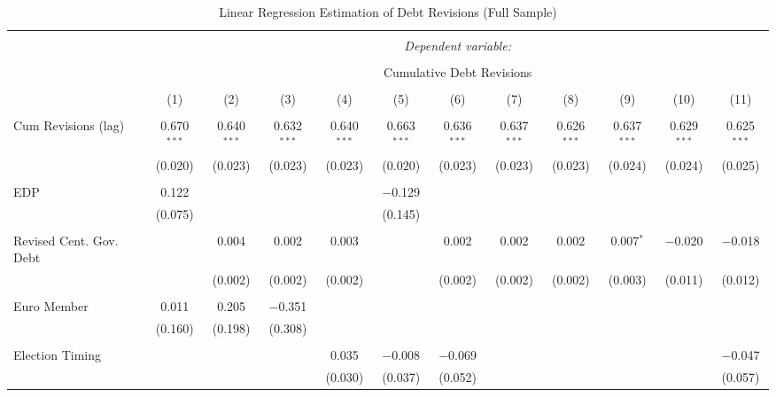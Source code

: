 
\begin{table}[!htbp] \centering 
  \caption{Linear Regression Estimation of Debt Revisions (Full Sample)} 
  \label{debt_results} 
\tiny 
\begin{tabular}{@{\extracolsep{5pt}}lccccccccccc} 
\\[-1.8ex]\hline 
\hline \\[-1.8ex] 
 & \multicolumn{11}{c}{\textit{Dependent variable:}} \\ 
\cline{2-12} 
\\[-1.8ex] & \multicolumn{11}{c}{Cumulative Debt Revisions} \\ 
\\[-1.8ex] & (1) & (2) & (3) & (4) & (5) & (6) & (7) & (8) & (9) & (10) & (11)\\ 
\hline \\[-1.8ex] 
 Cum Revisions (lag) & 0.670$^{***}$ & 0.640$^{***}$ & 0.632$^{***}$ & 0.640$^{***}$ & 0.663$^{***}$ & 0.636$^{***}$ & 0.637$^{***}$ & 0.626$^{***}$ & 0.637$^{***}$ & 0.629$^{***}$ & 0.625$^{***}$ \\ 
  & (0.020) & (0.023) & (0.023) & (0.023) & (0.020) & (0.023) & (0.023) & (0.023) & (0.024) & (0.024) & (0.025) \\ 
  & & & & & & & & & & & \\ 
 EDP & 0.122 &  &  &  & $-$0.129 &  &  &  &  &  &  \\ 
  & (0.075) &  &  &  & (0.145) &  &  &  &  &  &  \\ 
  & & & & & & & & & & & \\ 
 Revised Cent. Gov. Debt &  & 0.004 & 0.002 & 0.003 &  & 0.002 & 0.002 & 0.002 & 0.007$^{*}$ & $-$0.020 & $-$0.018 \\ 
  &  & (0.002) & (0.002) & (0.002) &  & (0.002) & (0.002) & (0.002) & (0.003) & (0.011) & (0.012) \\ 
  & & & & & & & & & & & \\ 
 Euro Member & 0.011 & 0.205 & $-$0.351 &  &  &  &  &  &  &  &  \\ 
  & (0.160) & (0.198) & (0.308) &  &  &  &  &  &  &  &  \\ 
  & & & & & & & & & & & \\ 
 Election Timing &  &  &  & 0.035 & $-$0.008 & $-$0.069 &  &  &  &  & $-$0.047 \\ 
  &  &  &  & (0.030) & (0.037) & (0.052) &  &  &  &  & (0.057) \\ 

\end{tabular}
\end{table}
